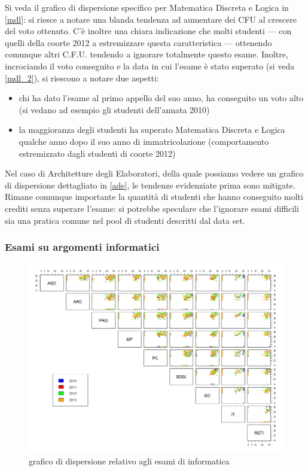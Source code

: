                 Si veda il grafico di dispersione specifico per Matematica Discreta e Logica in \ref{mdl}: si riesce a notare una blanda tendenza ad aumentare dei CFU al crescere del voto ottenuto. C’è inoltre una chiara indicazione che molti studenti –-- con quelli della coorte 2012 a estremizzare questa caratteristica –-- ottenendo comunque altri C.F.U. tendendo a ignorare totalmente questo esame. Inoltre, incrociando il voto conseguito e la data in cui l’esame è stato superato (si veda \ref{mdl_2}), si riescono a notare due aspetti:

                \begin{itemize}
                    \item chi ha dato l’esame al primo appello del suo anno, ha conseguito un voto alto (si vedano ad esempio gli studenti dell’annata 2010)
                    \item la maggioranza degli studenti ha superato Matematica Discreta e Logica qualche anno dopo il suo anno di immatricolazione (comportamento estremizzato dagli studenti di coorte 2012)
                \end{itemize}

                Nel caso di Architetture degli Elaboratori, della quale possiamo vedere un grafico di dispersione dettagliato in \ref{ade}, le tendenze evidenziate prima sono mitigate. Rimane comunque importante la quantità di studenti che hanno conseguito molti crediti senza superare l’esame: si potrebbe speculare che l’ignorare esami difficili sia una pratica comune nel pool di studenti descritti dal data set.

            \subsubsection{Esami su argomenti informatici}

                \begin{figure}
                    \centering
                    \caption{grafico di dispersione relativo agli esami di informatica}
                    \label{esami_inf}
                	\includegraphics[scale=0.32]{img/scatter_plot_7_gen.png}
                \end{figure}

